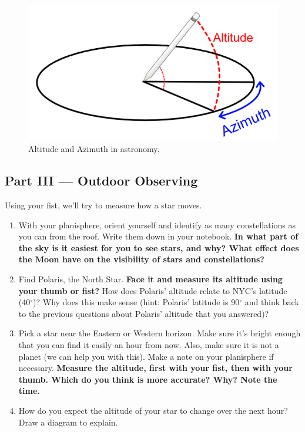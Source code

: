 \documentclass[11pt]{article}
\begin{document}
\begin{figure}[htb!] 
\center
\includegraphics[width=15cm]{altitude.png}
\caption{Altitude and Azimuth in astronomy.}
\label{fig: altitude}
\end{figure}

\subsection{Part III --- Outdoor Observing}

Using your fist, we'll try to measure how a star moves. 

\begin{enumerate}[resume]
    \item With your planisphere, orient yourself and identify as many constellations as you can from the roof.  Write them down in your notebook.  \textbf{In what part of the sky is it easiest for you to see stars, and why? What effect does the Moon have on the visibility of stars and constellations?}
    \item Find Polaris, the North Star. \textbf{Face it and measure its altitude using your thumb or fist?} How does Polaris' altitude relate to NYC's latitude (40$^{\circ}$)? Why does this make sense (hint: Polaris' latitude is 90$^{\circ}$ and think back to the previous questions about Polaris' altitude that you answered)?
    \item Pick a star near the Eastern or Western horizon.  Make sure it's bright enough that you can find it easily an hour from now. Also, make sure it is not a planet (we can help you with this). Make a note on your planisphere if necessary. \textbf{Measure the altitude, first with your fist, then with your thumb.  Which do you think is more accurate? Why? Note the time.}
    \item How do you expect the altitude of your star to change over the next hour? Draw a diagram to explain.
\end{enumerate}
\end{document}
